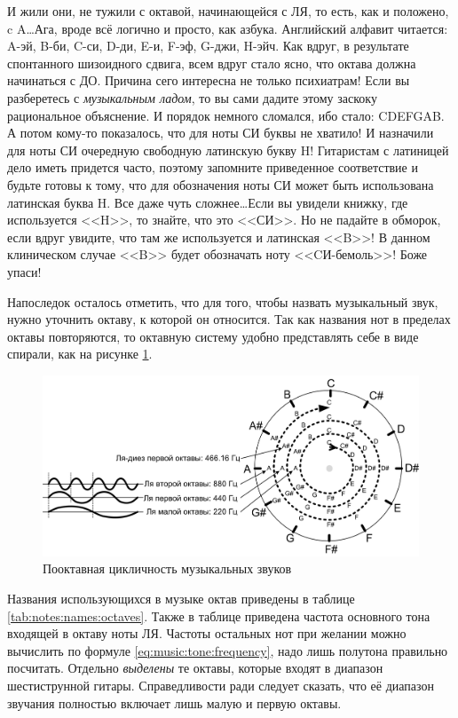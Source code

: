 \begin{Example}
    И жили они, не тужили с октавой, начинающейся с ЛЯ, то есть, как и положено, c A\ldots Ага, вроде всё логично и просто, как азбука. Английский алфавит читается: A-эй, B-би, C-си, D-ди, E-и, F-эф, G-джи, H-эйч. Как вдруг, в результате спонтанного шизоидного сдвига, всем вдруг стало ясно, что октава должна начинаться с ДО. Причина сего интересна не только психиатрам! Если вы разберетесь с \emph{музыкальным ладом}, то вы сами дадите этому заскоку рациональное объяснение. И порядок немного сломался, ибо стало: CDEFGAB. А потом кому-то показалось, что для ноты СИ буквы не хватило! И назначили для ноты СИ очередную свободную латинскую букву H! Гитаристам с латиницей дело иметь придется часто, поэтому запомните приведенное соответствие и будьте готовы к тому, что для обозначения ноты СИ может быть использована латинская буква H. Все даже чуть сложнее\ldots Если вы увидели книжку, где используется <<H>>, то знайте, что это <<СИ>>. Но не падайте в обморок, если вдруг увидите, что там же используется и латинская <<B>>! В данном клиническом случае <<B>> будет обозначать ноту <<CИ-бемоль>>! Боже упаси!
\end{Example}

Напоследок осталось отметить, что для того, чтобы назвать музыкальный звук, нужно уточнить октаву, к которой он относится. Так как названия нот в пределах октавы повторяются, то октавную систему удобно представлять себе в виде спирали, как на рисунке \ref{fig:notes:names:octave}.

\begin{figure}[!ht]
    \centering
    \includegraphics{fig/intervals/octave-spiral} 
    \caption{Пооктавная цикличность музыкальных звуков}\label{fig:notes:names:octave}
\end{figure} 


Названия использующихся в музыке октав приведены в таблице \ref{tab:notes:names:octaves}. Также в таблице приведена частота основного тона входящей в октаву ноты ЛЯ. Частоты остальных нот при желании можно вычислить по формуле \eqref{eq:music:tone:frequency}, надо лишь полутона правильно посчитать. Отдельно \emph{выделены} те октавы, которые входят в диапазон шестиструнной гитары. Справедливости ради следует сказать, что её диапазон звучания полностью включает лишь малую и первую октавы.

